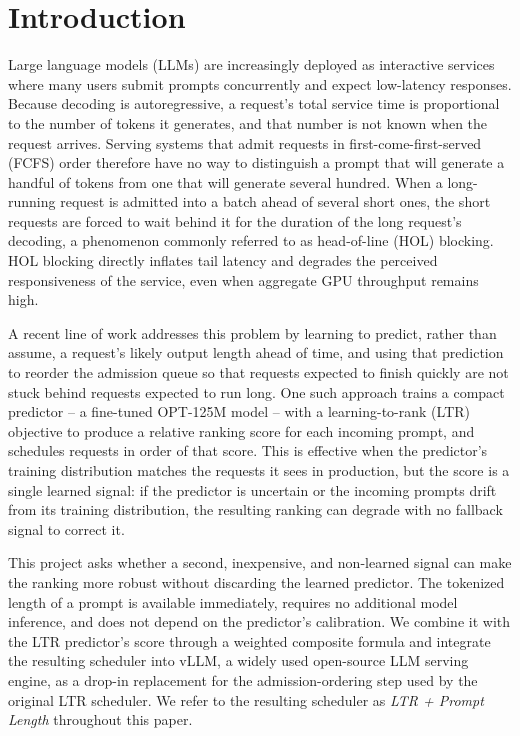 \section{Introduction}
\label{sec:introduction}

Large language models (LLMs) are increasingly deployed as interactive services
where many users submit prompts concurrently and expect low-latency responses.
Because decoding is autoregressive, a request's total service time is
proportional to the number of tokens it generates, and that number is not
known when the request arrives. Serving systems that admit requests in
first-come-first-served (FCFS) order therefore have no way to distinguish a
prompt that will generate a handful of tokens from one that will generate
several hundred. When a long-running request is admitted into a batch ahead of
several short ones, the short requests are forced to wait behind it for the
duration of the long request's decoding, a phenomenon commonly referred to as
head-of-line (HOL) blocking. HOL blocking directly inflates tail latency and
degrades the perceived responsiveness of the service, even when aggregate GPU
throughput remains high.

A recent line of work addresses this problem by learning to predict, rather
than assume, a request's likely output length ahead of time, and using that
prediction to reorder the admission queue so that requests expected to finish
quickly are not stuck behind requests expected to run long. One such approach
trains a compact predictor -- a fine-tuned OPT-125M model -- with a
learning-to-rank (LTR) objective to produce a relative ranking score for each
incoming prompt, and schedules requests in order of that score. This is
effective when the predictor's training distribution matches the requests it
sees in production, but the score is a single learned signal: if the predictor
is uncertain or the incoming prompts drift from its training distribution, the
resulting ranking can degrade with no fallback signal to correct it.

This project asks whether a second, inexpensive, and non-learned signal can
make the ranking more robust without discarding the learned predictor. The
tokenized length of a prompt is available immediately, requires no additional
model inference, and does not depend on the predictor's calibration. We
combine it with the LTR predictor's score through a weighted composite formula
and integrate the resulting scheduler into vLLM, a widely used open-source LLM
serving engine, as a drop-in replacement for the admission-ordering step used
by the original LTR scheduler. We refer to the resulting scheduler as
\emph{LTR + Prompt Length} throughout this paper.

